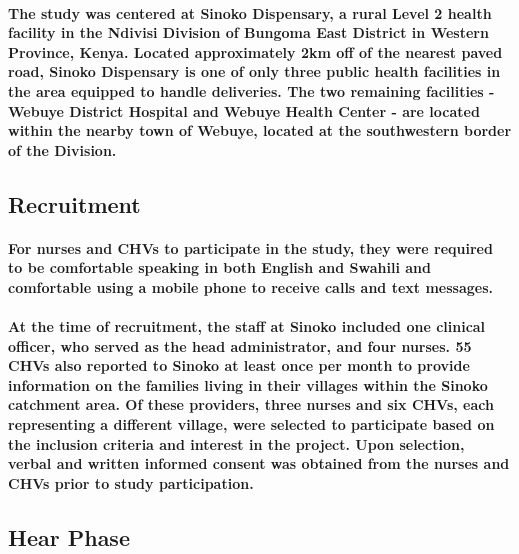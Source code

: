 \paragraph{The study was centered at Sinoko Dispensary, a rural Level 2 health facility in the Ndivisi Division of Bungoma East District in Western Province, Kenya. Located approximately 2km off of the nearest paved road, Sinoko Dispensary is one of only three public health facilities in the area  equipped to handle deliveries. The two remaining facilities - Webuye District Hospital and Webuye Health Center - are located within the nearby town of Webuye, located at the southwestern border of the Division.}

\subsection{Recruitment}
\paragraph{For nurses and CHVs to participate in the study, they were required to be comfortable speaking in both English and Swahili and comfortable using a mobile phone to receive calls and text messages.}

\paragraph{At the time of recruitment, the staff at Sinoko included one clinical officer, who served as the head administrator, and four nurses. 55 CHVs also reported to Sinoko at least once per month to provide information on the families living in their villages within the Sinoko catchment area. Of these providers, three nurses and six CHVs, each representing a different village, were selected to participate based on the inclusion criteria and interest in the project. Upon selection, verbal and written informed consent was obtained from the nurses and CHVs prior to study participation.}

\subsection{Hear Phase}
